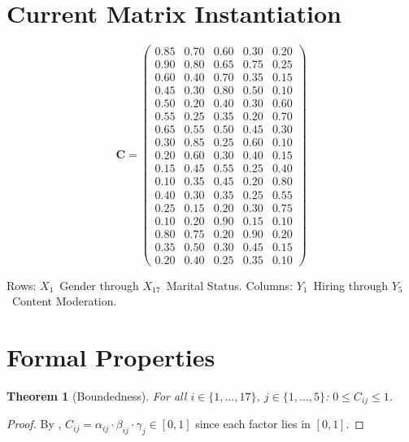 \documentclass[12pt,a4paper]{report}
\theoremstyle{plain}
\newtheorem{theorem}{Theorem}[chapter]
\theoremstyle{definition}
\theoremstyle{remark}
\newcommand{\scam}{\mathbf{C}}
\begin{document}
\section{Current Matrix Instantiation}

\begin{equation}
\scam = \begin{pmatrix}
0.85 & 0.70 & 0.60 & 0.30 & 0.20 \\
0.90 & 0.80 & 0.65 & 0.75 & 0.25 \\
0.60 & 0.40 & 0.70 & 0.35 & 0.15 \\
0.45 & 0.30 & 0.80 & 0.50 & 0.10 \\
0.50 & 0.20 & 0.40 & 0.30 & 0.60 \\
0.55 & 0.25 & 0.35 & 0.20 & 0.70 \\
0.65 & 0.55 & 0.50 & 0.45 & 0.30 \\
0.30 & 0.85 & 0.25 & 0.60 & 0.10 \\
0.20 & 0.60 & 0.30 & 0.40 & 0.15 \\
0.15 & 0.45 & 0.55 & 0.25 & 0.40 \\
0.10 & 0.35 & 0.45 & 0.20 & 0.80 \\
0.40 & 0.30 & 0.35 & 0.25 & 0.55 \\
0.25 & 0.15 & 0.20 & 0.30 & 0.75 \\
0.10 & 0.20 & 0.90 & 0.15 & 0.10 \\
0.80 & 0.75 & 0.20 & 0.90 & 0.20 \\
0.35 & 0.50 & 0.30 & 0.45 & 0.15 \\
0.20 & 0.40 & 0.25 & 0.35 & 0.10
\end{pmatrix}
\end{equation}

Rows: $X_1$~Gender through $X_{17}$~Marital Status.
Columns: $Y_1$~Hiring through $Y_5$~Content Moderation.

\section{Formal Properties}

\begin{theorem}[Boundedness]
\label{thm:bounded}
For all $i \in \{1,\ldots,17\}$, $j \in \{1,\ldots,5\}$:
$0 \leq C_{ij} \leq 1$.
\end{theorem}
\begin{proof}
By ,
$C_{ij} = \alpha_{ij} \cdot \beta_{ij} \cdot \gamma_j \in [0,1]$
since each factor lies in $[0,1]$.
\end{proof}
\end{document}
